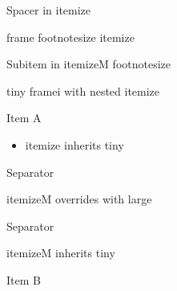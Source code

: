 \documentclass[11pt,compress,t,notes=noshow, xcolor=table]{beamer}
\begin{document}
\begin{frame}{Spacer in itemize}
  
  
\end{frame}

\begin{frame}{frame footnotesize itemize}
  \begin{itemizeM}[footnotesize]
    \item Subitem in itemizeM footnotesize
  \end{itemizeM}
\end{frame}


\begin{framei}[fs=tiny]{tiny framei with nested itemize}
  \item Item A
  \begin{itemize}
    \item itemize inherits tiny
  \end{itemize}
  \item Separator
  \begin{itemizeM}[large]
    \item itemizeM overrides with large
  \end{itemizeM}
  \item Separator
  \begin{itemizeM}
    \item itemizeM inherits tiny
  \end{itemizeM}
  \item Item B
\end{framei}
\end{document}
